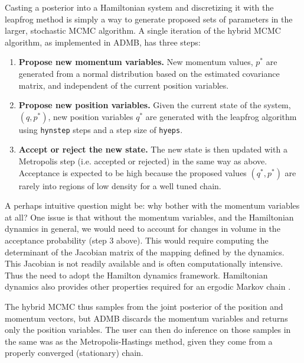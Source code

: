 \documentclass{article}\usepackage[]{graphicx}\usepackage[]{color}
\begin{document}
Casting a posterior into a Hamiltonian system and discretizing it with the
leapfrog method is simply a way to generate proposed sets of parameters in
the larger, stochastic MCMC algorithm. A single iteration of the hybrid
MCMC algorithm, as implemented in ADMB, has three steps:
\begin{enumerate}
\item \textbf{Propose new momentum variables.} New momentum values, $p^*$
  are generated from a normal distribution based on the estimated
  covariance matrix, and independent of the current position variables.
\item \textbf{Propose new position variables.} Given the current state of
  the system, $(q,p^*)$, new position variables $q^*$ are generated with
  the leapfrog algorithm using \texttt{hynstep} steps and a step size of
  \texttt{hyeps}.
\item \textbf{Accept or reject the new state.} The new state is then
  updated with a Metropolis step (i.e. accepted or rejected) in the same
  way as above. Acceptance is expected to be high because the proposed
  values $(q^*, p^*)$ are rarely into regions of low density for a well
  tuned chain.
\end{enumerate}

A perhaps intuitive question might be: why bother with the momentum
variables at all? One issue is that without the momentum variables, and the
Hamiltonian dynamics in general, we would need to account for changes in
volume in the acceptance probability (step 3 above)\cite{brooks2011}. This
would require computing the determinant of the Jacobian matrix of the
mapping defined by the dynamics. This Jacobian is not readily available and
is often computationally intensive. Thus the need to adopt the Hamilton
dynamics framework.  Hamiltonian dynamics also provides other properties
required for an ergodic Markov chain \cite{brooks2011}.

The hybrid MCMC thus samples from the joint posterior of the position and
momentum vectors, but ADMB discards the momentum variables and returns only
the position variables. The user can then do inference on those samples in
the same was as the Metropolis-Hastings method, given they come from a
properly converged (stationary) chain.
\end{document}
